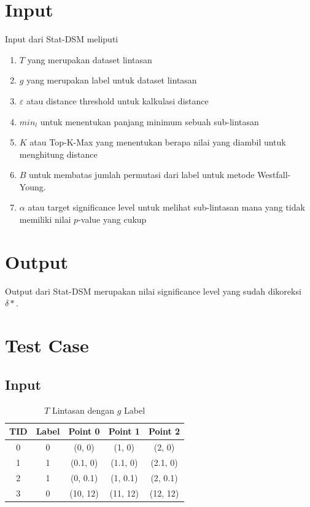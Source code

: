 \documentclass[a4paper,twoside]{article}
\begin{document}
\section{Input}
Input dari Stat-DSM meliputi 
\begin{enumerate}
    \item $T$ yang merupakan dataset lintasan 
    \item $g$ yang merupakan label untuk dataset lintasan
    \item $\varepsilon$ atau distance threshold untuk kalkulasi distance 
    \item $min_l$ untuk menentukan panjang minimum sebuah sub-lintasan
    \item $K$ atau Top-K-Max yang menentukan berapa nilai yang diambil untuk menghitung distance
    \item $B$ untuk membatas jumlah permutasi dari label untuk metode Westfall-Young. 
    \item $\alpha$ atau target significance level untuk melihat sub-lintasan mana yang tidak memiliki nilai $p$-value yang cukup 
\end{enumerate}

\section{Output}
Output dari Stat-DSM merupakan nilai significance level yang sudah dikoreksi $\delta*$.

\section{Test Case}
\subsection{Input}
\begin{table}[htbp]
    \centering
    \caption{$T$ Lintasan dengan $g$ Label}
    \label{tab:trajectory_data}
    \begin{tabular}{ccccc}
    \hline
    \textbf{TID} & \textbf{Label} & \textbf{Point 0} & \textbf{Point 1} & \textbf{Point 2} \\ \hline
    0   & 0     & (0, 0)      & (1, 0)      & (2, 0)      \\
    1   & 1     & (0.1, 0)    & (1.1, 0)    & (2.1, 0)    \\
    2   & 1     & (0, 0.1)    & (1, 0.1)    & (2, 0.1)    \\
    3   & 0     & (10, 12)    & (11, 12)    & (12, 12)    \\ \hline
\end{tabular}
\end{table}
\end{document}
